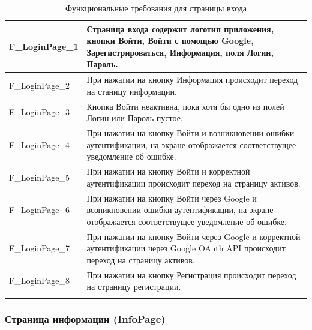 \documentclass[a4paper, 14pt]{article}
\begin{document}
\begin{longtable}{| p{} | p{} |}
    F\_LoginPage\_1                 & Страница входа содержит логотип приложения, кнопки Войти, Войти с помощью Google, Зарегистрироваться, Информация, поля Логин, Пароль.                                                  \\ \hline
    F\_LoginPage\_2                 & При нажатии на кнопку Информация происходит переход на станицу информации.                                                                                                         \\ \hline
    F\_LoginPage\_3                 & Кнопка Войти неактивна, пока хотя бы одно из полей Логин или Пароль пустое.                                                                                                        \\ \hline
    F\_LoginPage\_4                 & При нажатии на кнопку Войти и возникновении ошибки аутентификации, на экране отображается соответствущее уведомление об ошибке.                                                    \\ \hline
    F\_LoginPage\_5                 & При нажатии на кнопку Войти и корректной аутентификации происходит переход на страницу активов.                                                                                    \\ \hline
    F\_LoginPage\_6                 & При нажатии на кнопку Войти через Google и возникновении ошибки аутентификации, на экране отображается соответствущее уведомление об ошибке.                                       \\ \hline
    F\_LoginPage\_7                 & При нажатии на кнопку Войти через Google и корректной аутентификации через Google OAuth API происходит переход на страницу активов.                                                \\ \hline
    F\_LoginPage\_8                 & При нажатии на кнопку Регистрация происходит переход на страницу регистрации.                                                                                                      \\ \hline

    \caption{Функциональные требования для страницы входа}
\end{longtable}

\subsubsection{Страница информации (InfoPage)}
\end{document}
